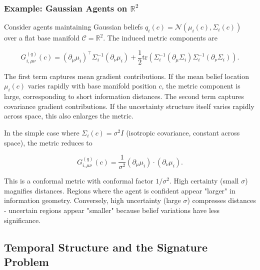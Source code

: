 \documentclass[11pt]{article}
\begin{document}
\subsubsection{Example: Gaussian Agents on $\mathbb{R}^2$}

Consider agents maintaining Gaussian beliefs $q_i(c) = \mathcal{N}(\mu_i(c), \Sigma_i(c))$ over a flat base manifold $\mathcal{C} = \mathbb{R}^2$. The induced metric components are

\begin{equation}
G^{(q)}_{i,\mu\nu}(c) = (\partial_\mu \mu_i)^\top \Sigma_i^{-1} (\partial_\nu \mu_i) + \frac{1}{2}\mathrm{tr}\left(\Sigma_i^{-1}(\partial_\mu \Sigma_i)\Sigma_i^{-1}(\partial_\nu \Sigma_i)\right).
\end{equation}

The first term captures mean gradient contributions. If the mean belief location $\mu_i(c)$ varies rapidly with base manifold position $c$, the metric component is large, corresponding to short information distances. The second term captures covariance gradient contributions. If the uncertainty structure itself varies rapidly across space, this also enlarges the metric.

In the simple case where $\Sigma_i(c) = \sigma^2 I$ (isotropic covariance, constant across space), the metric reduces to

\begin{equation}
G^{(q)}_{i,\mu\nu}(c) = \frac{1}{\sigma^2}(\partial_\mu \mu_i) \cdot (\partial_\nu \mu_i).
\end{equation}

This is a conformal metric with conformal factor $1/\sigma^2$. High certainty (small $\sigma$) magnifies distances.  Regions where the agent is confident appear "larger" in information geometry. Conversely, high uncertainty (large $\sigma$) compresses distances - uncertain regions appear "smaller" because belief variations have less significance.

\subsection{Temporal Structure and the Signature Problem}
\label{sec:signature_resolution}
\end{document}
